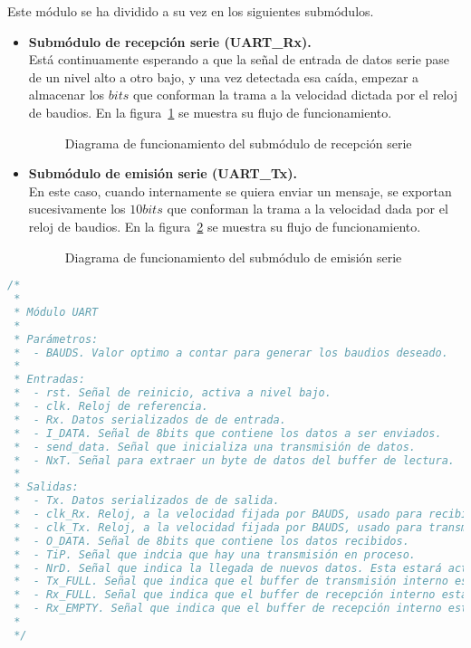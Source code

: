 Este módulo se ha dividido a su vez en los siguientes submódulos.
\begin{itemize}
    \item \textbf{Submódulo de recepción serie (UART\_Rx).} \\
    Está continuamente esperando a que la señal de entrada de datos serie pase de un nivel alto a otro bajo, y una vez detectada esa caída, empezar a almacenar los $bits$ que conforman la trama a la velocidad dictada por el reloj de baudios. En la figura~\ref{fig:flujo_uart_rx} se muestra su flujo de funcionamiento.

    \begin{figure}[!hbt]
        \centering
        \scalebox{0.85} {}
        \caption{Diagrama de funcionamiento del submódulo de recepción serie}
        \label{fig:flujo_uart_rx}
    \end{figure}
    
    \item \textbf{Submódulo de emisión serie (UART\_Tx).} \\
    En este caso, cuando internamente se quiera enviar un mensaje, se exportan sucesivamente los $10bits$ que conforman la trama a la velocidad dada por el reloj de baudios. En la figura~\ref{fig:flujo_uart_tx} se muestra su flujo de funcionamiento.
    \begin{figure}[!hbt]
        \centering
        \scalebox{0.85} {}
        \caption{Diagrama de funcionamiento del submódulo de emisión serie}
        \label{fig:flujo_uart_tx}
    \end{figure}
\end{itemize}

\newpage %
\begin{lstlisting}[language=Verilog,
    caption={Parámetros, entradas y salidas del módulo UART.},
    label=src:resultados-modulos-uart]
/*
 *
 * Módulo UART
 *
 * Parámetros:
 *  - BAUDS. Valor optimo a contar para generar los baudios deseado.
 *
 * Entradas:
 *  - rst. Señal de reinicio, activa a nivel bajo.
 *  - clk. Reloj de referencia.
 *  - Rx. Datos serializados de de entrada.
 *  - I_DATA. Señal de 8bits que contiene los datos a ser enviados.
 *  - send_data. Señal que inicializa una transmisión de datos.
 *  - NxT. Señal para extraer un byte de datos del buffer de lectura.
 *
 * Salidas:
 *  - Tx. Datos serializados de de salida.
 *  - clk_Rx. Reloj, a la velocidad fijada por BAUDS, usado para recibir los datos.
 *  - clk_Tx. Reloj, a la velocidad fijada por BAUDS, usado para transmitir los datos.
 *  - O_DATA. Señal de 8bits que contiene los datos recibidos.
 *  - TiP. Señal que indcia que hay una transmisión en proceso.
 *  - NrD. Señal que indica la llegada de nuevos datos. Esta estará activa un pulso de clk.
 *  - Tx_FULL. Señal que indica que el buffer de transmisión interno está lleno.
 *  - Rx_FULL. Señal que indica que el buffer de recepción interno está lleno.
 *  - Rx_EMPTY. Señal que indica que el buffer de recepción interno está vacío.
 *
 */
\end{lstlisting}



